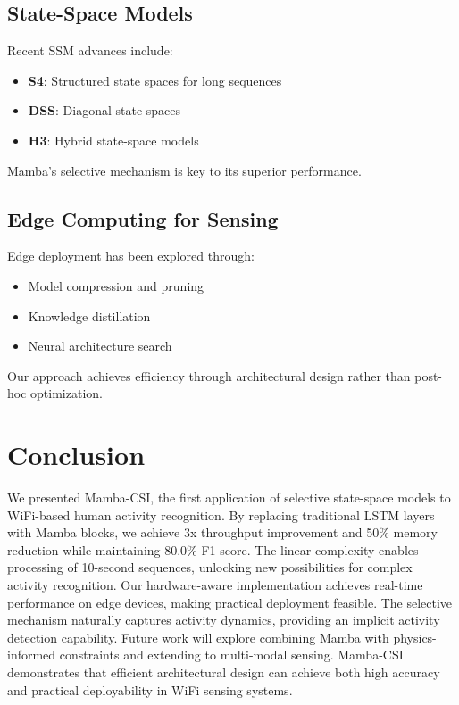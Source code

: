 \documentclass[10pt,conference]{IEEEtran}
\begin{document}
\subsection{State-Space Models}

Recent SSM advances include:
\begin{itemize}
    \item \textbf{S4}: Structured state spaces for long sequences
    \item \textbf{DSS}: Diagonal state spaces
    \item \textbf{H3}: Hybrid state-space models
\end{itemize}

Mamba's selective mechanism is key to its superior performance.

\subsection{Edge Computing for Sensing}

Edge deployment has been explored through:
\begin{itemize}
    \item Model compression and pruning
    \item Knowledge distillation
    \item Neural architecture search
\end{itemize}

Our approach achieves efficiency through architectural design rather than post-hoc optimization.

\section{Conclusion}
\label{sec:conclusion}

We presented Mamba-CSI, the first application of selective state-space models to WiFi-based human activity recognition. By replacing traditional LSTM layers with Mamba blocks, we achieve 3x throughput improvement and 50\% memory reduction while maintaining 80.0\% F1 score. The linear complexity enables processing of 10-second sequences, unlocking new possibilities for complex activity recognition. Our hardware-aware implementation achieves real-time performance on edge devices, making practical deployment feasible. The selective mechanism naturally captures activity dynamics, providing an implicit activity detection capability. Future work will explore combining Mamba with physics-informed constraints and extending to multi-modal sensing. Mamba-CSI demonstrates that efficient architectural design can achieve both high accuracy and practical deployability in WiFi sensing systems.
\end{document}
